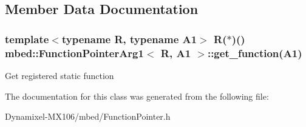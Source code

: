 \subsection{Member Data Documentation}
\subsubsection[{\texorpdfstring{get\+\_\+function}{get_function}}]{\setlength{\rightskip}{0pt plus 5cm}template$<$typename R, typename A1$>$ R($\ast$)() {\bf mbed\+::\+Function\+Pointer\+Arg1}$<$ R, A1 $>$\+::get\+\_\+function(A1)\hspace{0.3cm}{\ttfamily [inline]}}\hypertarget{classmbed_1_1_function_pointer_arg1_a8dfc6095837c03196cf8027faf680c25}{}\label{classmbed_1_1_function_pointer_arg1_a8dfc6095837c03196cf8027faf680c25}
Get registered static function 

The documentation for this class was generated from the following file\+:\begin{DoxyCompactItemize}
\item 
Dynamixel-\/\+M\+X106/mbed/Function\+Pointer.\+h\end{DoxyCompactItemize}

